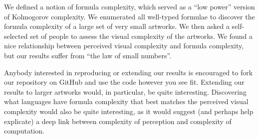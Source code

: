 \documentclass[11pt]{article}
\begin{document}
We defined a notion of formula complexity, which served as a ``low power''
version of Kolmogorov complexity.  We enumerated all well-typed formulae to
discover the formula complexity of a large set of very small artworks.  We then
asked a self-selected set of people to assess the visual complexity of the
artworks.  We found a nice relationship between perceived visual complexity and
formula complexity, but our results suffer from ``the law of small
numbers''\cite{smallnumbers}.

Anybody interested in reproducing or extending our results is encouraged to
fork our repository on GitHub and use the code however you see fit.  Extending
our results to larger artworks would, in particular, be quite interesting.
Discovering what languages have formula complexity that best matches the
perceived visual complexity would also be quite interesting, as it would
suggest (and perhaps help explicate) a deep link between complexity of
perception and complexity of computation.  
\end{document}
